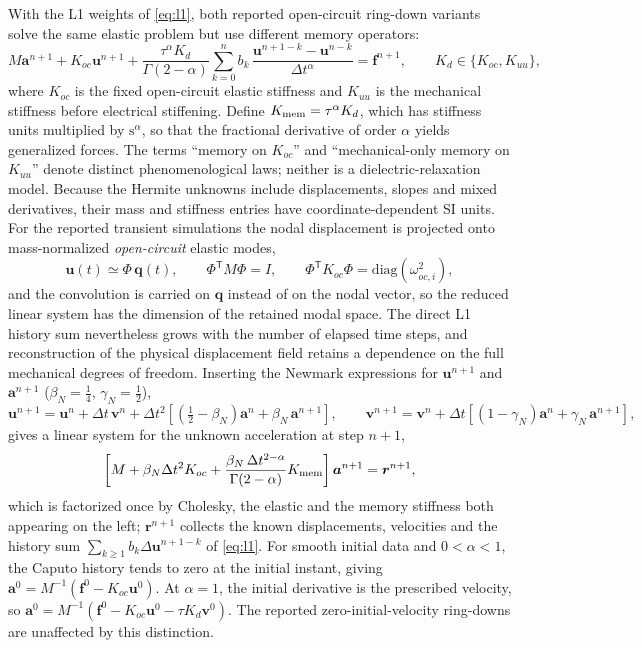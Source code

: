 With the L1 weights of \eqref{eq:l1}, both reported open-circuit
ring-down variants solve the same elastic problem but use different memory
operators:
\begin{equation}
  M\bm{a}^{n+1} + K_{oc}\bm{u}^{n+1} +
  \frac{\tau^\alpha K_d}{\Gamma(2-\alpha)}
  \sum_{k=0}^{n} b_{k}\,\frac{\bm{u}^{n+1-k}-\bm{u}^{n-k}}{\Delta t^{\alpha}}
  = \bm{f}^{n+1},\qquad K_d\in\{K_{oc},K_{uu}\},
  \label{eq:step}
\end{equation}
where $K_{oc}$ is the fixed open-circuit elastic stiffness and
$K_{uu}$ is the mechanical stiffness before electrical stiffening.
Define $K_{\rm mem}=\tau^\alpha K_d$, which has stiffness units
multiplied by $\mathrm{s}^{\alpha}$, so that the fractional derivative
of order $\alpha$ yields generalized forces. The terms ``memory on
$K_{oc}$'' and ``mechanical-only memory on $K_{uu}$'' denote distinct
phenomenological laws; neither is a dielectric-relaxation model. Because
the Hermite unknowns include displacements, slopes and mixed derivatives,
their mass and stiffness entries have coordinate-dependent SI units.
For the reported transient simulations the nodal displacement is projected
onto mass-normalized \emph{open-circuit} elastic modes,
\begin{equation}
  \bm{u}(t) \simeq \Phi\,\bm{q}(t),\qquad
  \Phi^{\mathsf T}M\Phi = I,\qquad
  \Phi^{\mathsf T}K_{oc}\Phi = \mathrm{diag}(\omega_{oc,i}^2),
  \label{eq:modal}
\end{equation}
and the convolution is carried on $\bm{q}$ instead of on the nodal vector, so the reduced linear system has the dimension of the retained modal
space. The direct L1 history sum nevertheless grows with the number of
elapsed time steps, and reconstruction of the physical displacement field
retains a dependence on the full mechanical degrees of freedom. Inserting the Newmark expressions for
$\bm{u}^{n+1}$ and $\bm{a}^{n+1}$ ($\beta_N=\tfrac14$, $\gamma_N=\tfrac12$),
\begin{equation}
  \bm{u}^{n+1} = \bm{u}^{n} + \Delta t\,\bm{v}^{n}
     + \Delta t^{2}\left[\left(\tfrac12-\beta_N\right)\bm{a}^{n}
       + \beta_N\,\bm{a}^{n+1}\right],
  \qquad
  \bm{v}^{n+1} = \bm{v}^{n} + \Delta t\left[(1-\gamma_N)\bm{a}^{n}
       + \gamma_N\,\bm{a}^{n+1}\right],
  \label{eq:newmark}
\end{equation}
gives a linear system for the unknown acceleration at step $n+1$,
\begin{equation}
  \left[M + \beta_N\Delta t^{2}K_{oc} +
    \frac{\beta_N\,\Delta t^{2-\alpha}}{\Gamma(2-\alpha)}K_{\rm mem}\right]
  \bm{a}^{n+1} = \bm{r}^{n+1},
  \label{eq:stepA}
\end{equation}
which is factorized once by Cholesky, the elastic and the memory stiffness both
appearing on the left; $\bm{r}^{n+1}$ collects the known displacements,
velocities and the history sum $\sum_{k\ge1}b_{k}\Delta\bm{u}^{n+1-k}$ of
\eqref{eq:l1}. For smooth initial data and $0<\alpha<1$, the Caputo history tends to
zero at the initial instant, giving
$\bm a^0=M^{-1}(\bm f^0-K_{oc}\bm u^0)$.
At $\alpha=1$, the initial derivative is the prescribed velocity, so
$\bm a^0=M^{-1}(\bm f^0-K_{oc}\bm u^0-\tau K_d\bm v^0)$.
The reported zero-initial-velocity ring-downs are unaffected by this distinction.

